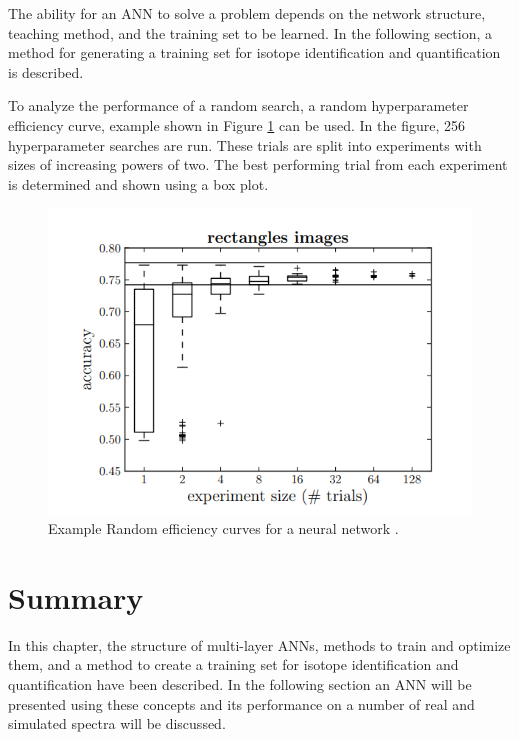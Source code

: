 The ability for an ANN to solve a problem depends on the network structure, teaching method, and the training set to be learned. In the following section, a method for generating a training set for isotope identification and quantification is described.

To analyze the performance of a random search, a random hyperparameter efficiency curve, example shown in Figure \ref{fig:Bergstra_random_efficiency_curve_DNN} can be used. In the figure, 256 hyperparameter searches are run. These trials are split into experiments with sizes of increasing powers of two. The best performing trial from each experiment is determined and shown using a box plot.


\begin{figure}[H]
	\centering
	\includegraphics[width=0.9\linewidth]{model_choice_hyperparameter_search_images/Bergstra12_random_efficiency_curve}
	\caption{Example Random efficiency curves for a neural network \cite{Bergstra2012}.}
	\label{fig:Bergstra_random_efficiency_curve_DNN}
\end{figure}



\section{Summary}

In this chapter, the structure of multi-layer ANNs, methods to train and optimize them, and a method to create a training set for isotope identification and quantification have been described. In the following section an ANN will be presented using these concepts and its performance on a number of real and simulated spectra will be discussed. 










